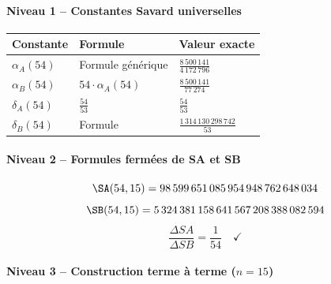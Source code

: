 \vspace{0.3cm}

\paragraph{Niveau 1 -- Constantes Savard universelles}

\begin{center}
\small
\begin{tabular}{@{}lll@{}}
\toprule
\rowcolor{spectralgris}
\textbf{Constante} & \textbf{Formule} & \textbf{Valeur exacte} \\
\midrule
$\alpha_A(54)$ & Formule générique & $\frac{8\,500\,141}{4\,172\,796}$ \\
$\alpha_B(54)$ & $54 \cdot \alpha_A(54)$ & $\frac{8\,500\,141}{77\,274}$ \\
$\delta_A(54)$ & $\frac{54}{53}$ & $\frac{54}{53}$ \\
$\delta_B(54)$ & Formule & $\frac{1\,314\,130\,298\,742}{53}$ \\
\bottomrule
\end{tabular}
\end{center}

\vspace{0.3cm}

\paragraph{Niveau 2 -- Formules fermées de SA et SB}

$$\SA(54, 15) = 98\,599\,651\,085\,954\,948\,762\,648\,034$$
$$\SB(54, 15) = 5\,324\,381\,158\,641\,567\,208\,388\,082\,594$$
$$\frac{\Delta SA}{\Delta SB} = \frac{1}{54} \quad \checkmark$$

\vspace{0.3cm}

\paragraph{Niveau 3 -- Construction terme à terme ($n = 15$)}

